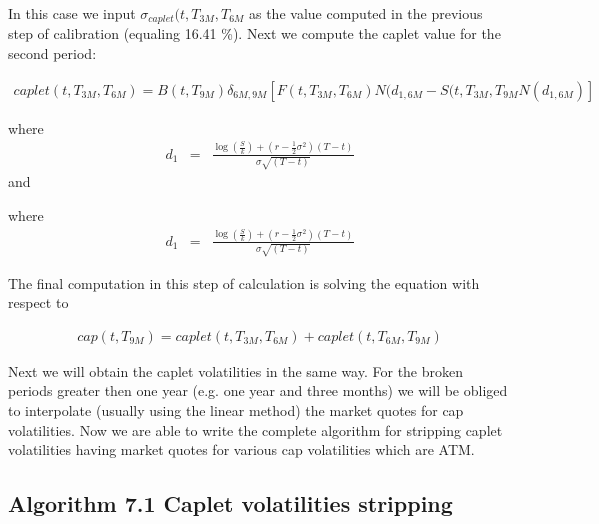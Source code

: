 \documentclass[11pt]{article}
\numberwithin{equation}{subsection}
\begin{document}
In this case we input \(\sigma_{caplet}(t, T_{3M}, T_{6M}\) as the value computed in the previous step
of calibration (equaling 16.41 \%). Next we compute the caplet value for the second
period:

\begin{eqnarray*}
	caplet(t, T_{3M}, T_{6M}) = B(t, T_{9M}) \delta_{6M,9M} [  F(t, T_{3M}, T_{6M}) N(d_{1,6M} -  S(t, T_{3M}, T_{9M}N(d_{1,6M}) ]
\end{eqnarray*}

where 
\begin{eqnarray*}
	d_1&=&\frac{\log(\frac{S}{k})+(r-\frac{1}{2}\sigma^2)(T-t)}{\sigma\sqrt{(T-t)}}
\end{eqnarray*}
and 

where 
\begin{eqnarray*}
	d_1&=&\frac{\log(\frac{S}{k})+(r-\frac{1}{2}\sigma^2)(T-t)}{\sigma\sqrt{(T-t)}}
\end{eqnarray*}

The final computation in this step of calculation is solving the equation with respect to

\begin{eqnarray*}
	cap(t, T_{9M}) = caplet(t, T_{3M}, T_{6M}) + caplet(t, T_{6M}, T_{9M})
\end{eqnarray*}


Next we will obtain the caplet volatilities in the same way. For the broken periods greater
then one year (e.g. one year and three months) we will be obliged to interpolate (usually
using the linear method) the market quotes for cap volatilities.
Now we are able to write the complete algorithm for stripping caplet volatilities having
market quotes for various cap volatilities which are ATM.


\subsection*{Algorithm 7.1 Caplet volatilities stripping}
\end{document}
